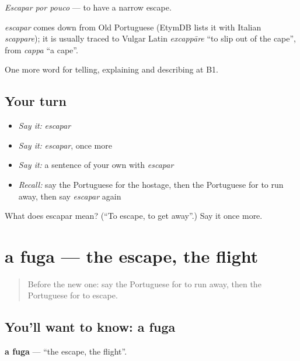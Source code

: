 \emph{Escapar por pouco} — to have a narrow escape.

\begin{cousinweb}
\emph{escapar} comes down from Old Portuguese (EtymDB lists it with Italian \emph{scappare}); it is usually traced to Vulgar Latin \emph{excappāre} \textquotedblleft{}to slip out of the cape\textquotedblright{}, from \emph{cappa} \textquotedblleft{}a cape\textquotedblright{}.
\end{cousinweb}

\begin{grammarlens}[title={What you've built}]
One more word for telling, explaining and describing at B1.
\end{grammarlens}

\subsection*{Your turn}
\begin{itemize}
\raggedright
  \item \emph{Say it:} \emph{escapar}
  \item \emph{Say it:} \emph{escapar}, once more
  \item \emph{Say it:} a sentence of your own with \emph{escapar}
  \item \emph{Recall:} say the Portuguese for the hostage, then the Portuguese for to run away, then say \emph{escapar} again
\end{itemize}

\begin{tcolorbox}[breakable,colback=teal!4,colframe=teal!35!black,title={Before you move on}]
What does escapar mean? (\textquotedblleft{}To escape, to get away\textquotedblright{}.) Say it once more.
\end{tcolorbox}
\section[a fuga]{a fuga — the escape, the flight}

\label{lesson:PT-C292-fuga}



\begin{quote}
Before the new one: say the Portuguese for to run away, then the Portuguese for to escape.
\end{quote}

\subsection*{You'll want to know: a fuga}
\textbf{a fuga} — \textquotedblleft{}the escape, the flight\textquotedblright{}.

